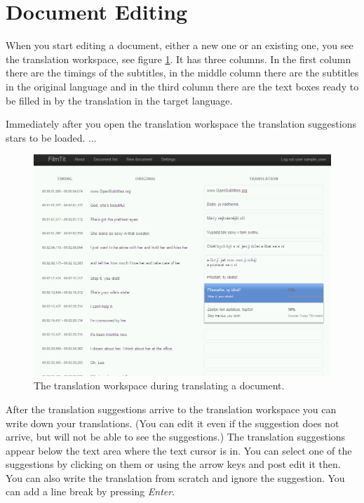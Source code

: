 \section{Document Editing}
\label{sec:document_editing}

When you start editing a document, either a new one or an existing one, you see the translation workspace, see figure \ref{fig:translation_workspace}. It has three columns. In the first column there are the timings of the subtitles, in the middle column there are the subtitles in the original language and in the third column there are the text boxes ready to be filled in by the translation in the target language.

Immediately after you open the translation workspace the translation suggestions stars to be loaded.  ...

\begin{figure}[h]
\begin{center}
\includegraphics[scale=0.4]{figures/user_manual/translation_workspace.png}
\end{center}
\caption{The translation workspace during translating a document.}
\label{fig:translation_workspace}
\end{figure}

After the translation suggestions arrive to the translation workspace you can write down your translations.  (You can edit it even if the suggestion does not arrive, but will not be able to see the suggestions.) The translation suggestions appear below the text area where the text cursor is in. You can select one of the suggestions by clicking on them or using the arrow keys and post edit it then. You can also write the translation from scratch and ignore the suggestion. You can add a line break by pressing \emph{Enter}.


